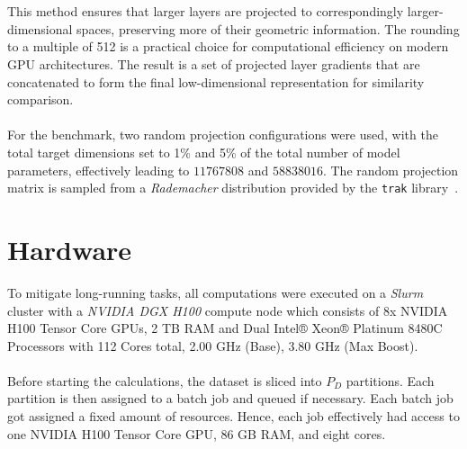 \\\\
This method ensures that larger layers are projected to correspondingly larger-dimensional spaces, preserving more of their geometric information. The rounding to a multiple of 512 is a practical choice for computational efficiency on modern GPU architectures. The result is a set of projected layer gradients that are concatenated to form the final low-dimensional representation for similarity comparison.
\\\\
For the benchmark, two random projection configurations were used, with the total target
dimensions set to 1\% and 5\% of the total number of model parameters, effectively leading to $11767808$ and $58838016$. The random projection matrix is sampled from a \emph{Rademacher} distribution provided by the \texttt{trak} library~\cite{park2023trak}.

\section{Hardware}\label{sec:hardware}
To mitigate long-running tasks, all computations were executed on a \emph{Slurm} cluster with a \emph{NVIDIA DGX H100} compute node which consists of 8x NVIDIA H100 Tensor Core GPUs, 2 TB RAM and Dual Intel® Xeon® Platinum 8480C Processors with
112 Cores total, 2.00 GHz (Base), 3.80 GHz (Max Boost). 
\\\\
Before starting the calculations, the dataset is sliced into $P_D$ partitions. Each partition is then assigned to a batch job and queued if necessary. Each batch job got assigned a fixed amount of resources. Hence, each job effectively had access to one NVIDIA H100 Tensor Core GPU, 86 GB RAM, and eight cores.

